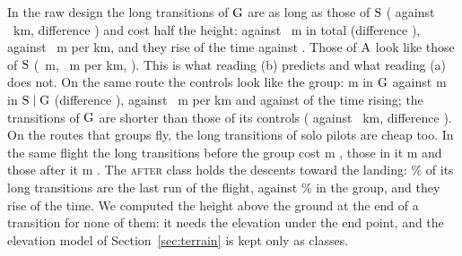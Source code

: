 In the raw design the long transitions of $\mathrm{G}$ are as long as those of $\mathrm{S}$ (\TlDescRawPathG{} against \TlDescRawPathS~km, difference \TlDescRawPathGapGS{} \TlDescRawPathGapGSBand) and cost half the height: \TlDescRawHeightG{} against \TlDescRawHeightS~m in total (difference \TlDescRawHeightGapGS{} \TlDescRawHeightGapGSBand), \TlDescRawSinkG{} against \TlDescRawSinkS~m per km, and they rise \TlDescRawRiseG{} of the time against \TlDescRawRiseS. Those of $\mathrm{A}$ look like those of $\mathrm{S}$ (\TlDescRawHeightA~m, \TlDescRawSinkA~m per km, \TlDescRawRiseA). This is what reading (b) predicts and what reading (a) does not. On the same route the controls look like the group: \TlDescRouteHeightG{} m in $\mathrm{G}$ against \TlDescRouteHeightSG{} m in $\mathrm{S}\mid\mathrm{G}$ (difference \TlDescRouteHeightGapG{} \TlDescRouteHeightGapGBand), \TlDescRouteSinkG{} against \TlDescRouteSinkSG~m per km and \TlDescRouteRiseG{} against \TlDescRouteRiseSG{} of the time rising; the transitions of $\mathrm{G}$ are shorter than those of its controls (\TlDescRoutePathG{} against \TlDescRoutePathSG~km, difference \TlDescRoutePathGapG{} \TlDescRoutePathGapGBand). On the routes that groups fly, the long transitions of solo pilots are cheap too. In the same flight the long transitions before the group cost \TlDescFlightHeightBefore{} m \TlDescFlightHeightBeforeBand, those in it \TlDescFlightHeightIn{} m \TlDescFlightHeightInBand{} and those after it \TlDescFlightHeightAfter{} m \TlDescFlightHeightAfterBand. The \textsc{after} class holds the descents toward the landing: \TlDescFlightLastAfter\% of its long transitions are the last run of the flight, against \TlDescFlightLastIn\% in the group, and they rise \TlDescFlightRiseAfter{} of the time. We computed the height above the ground at the end of a transition for none of them: it needs the elevation under the end point, and the elevation model of Section~\ref{sec:terrain} is kept only as classes.

